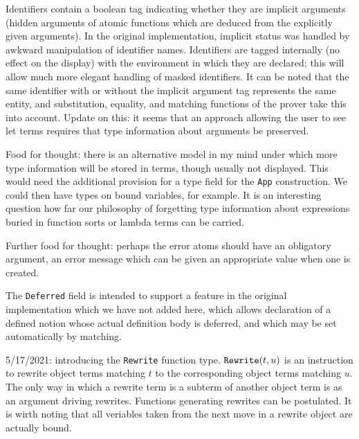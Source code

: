\documentclass[12pt]{article}
\begin{document}
Identifiers contain a boolean tag indicating whether they are implicit arguments (hidden arguments of atomic functions which are deduced from the explicitly given arguments).  In the original implementation, implicit status was handled by awkward manipulation of identifier names.  Identifiers are tagged internally (no effect on the display) with the environment in which they are declared;  this will allow much more elegant handling of masked identifiers.   It can be noted that the same identifier with or without the implicit argument tag represents the same entity, and substitution, equality, and matching functions of the prover take this into account.  Update on this:  it seems that an approach allowing the user to see let terms requires that type information about arguments be preserved.

Food for thought:  there is an alternative model in my mind under which more type information will be stored in terms, though usually not displayed.
This would need the additional provision for a type field for the {\tt App} construction.  We could then have types on bound variables, for example.  It is an interesting
question how far our philosophy of forgetting type information about expressions buried in function sorts or lambda terms can be carried.

Further food for thought: perhaps the error atoms should have an obligatory argument, an error message which can be given an appropriate value when one is created.

The {\tt Deferred} field is intended to support a feature in the original implementation which we have not added here, which allows declaration of a defined notion whose
actual definition body is deferred, and which may be set automatically by matching.

5/17/2021:  introducing the {\tt Rewrite} function type.  ${\tt Rewrite}(t,u)$ is an instruction to rewrite object terms matching $t$ to the corresponding object terms matching $u$.
The only way in which a rewrite term is a subterm of another object term is as an argument driving rewrites.  Functions generating rewrites can be postulated.  It is wirth noting that
all veriables taken from the next move in a rewrite object are actually bound.
\end{document}
